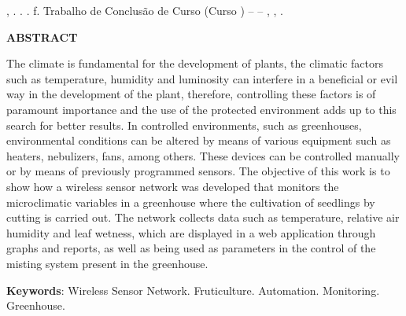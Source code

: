 %
%

\begin{ABSTRACT}

    \begin{SingleSpace}
	   \noindent
		{\expandafter\uppercase\expandafter{\imprimirsobrenomeautor}}, {\imprimirnomeautor}. \textbf{{\imprimirtitulotb}}. {\imprimirdata}. \pageref{LastPage}f. Trabalho de Conclusão de Curso (Curso {\imprimirprograma}) – {\imprimirinstituicao} – {\imprimirdepartamento}, {\imprimirlocal}, {\imprimirdata}.
		
	\end{SingleSpace}
    
    \vspace{1cm}
    
    \begin{center}
	    \textbf{ABSTRACT}
    \end{center}%
    
	\begin{SingleSpace}
		\hspace{-1.3 cm}The climate is fundamental for the development of plants, the climatic factors such as temperature, humidity and luminosity can interfere in a beneficial or evil way in the development of the plant, therefore, controlling these factors is of paramount importance and the use of the protected environment adds up to this search for better results. In controlled environments, such as greenhouses, environmental conditions can be altered by means of various equipment such as heaters, nebulizers, fans, among others. These devices can be controlled manually or by means of previously programmed sensors.
        The objective of this work is to show how a wireless sensor network was developed that monitors the microclimatic variables in a greenhouse where the cultivation of seedlings by cutting is carried out. The network collects data such as temperature, relative air humidity and leaf wetness, which are displayed in a web application through graphs and reports, as well as being used as parameters in the control of the misting system present in the greenhouse.

		\vspace*{0.5cm}\hspace{-1.3 cm}\textbf{Keywords}: Wireless Sensor Network. Fruticulture. Automation. Monitoring. Greenhouse.

		
	\end{SingleSpace}

\end{ABSTRACT}
